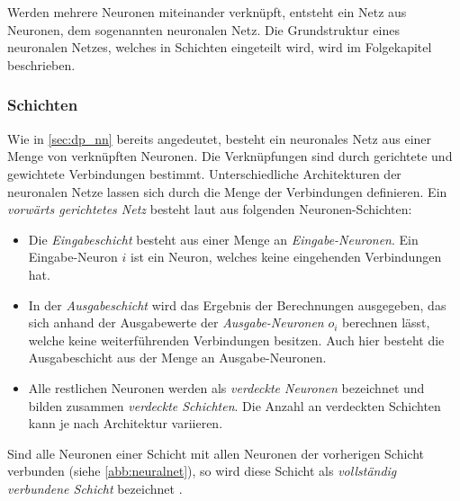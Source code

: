 \documentclass[12pt,a4paper,bibliography=totocnumbered,listof=totocnumbered]{article}
\begin{document}
\\\\Werden mehrere Neuronen miteinander verknüpft, entsteht ein Netz aus Neuronen, dem sogenannten neuronalen Netz. Die Grundstruktur eines neuronalen Netzes, welches in Schichten eingeteilt wird, wird im Folgekapitel beschrieben.

\subsubsection{Schichten}
Wie in \autoref{sec:dp_nn} bereits angedeutet, besteht ein neuronales Netz aus einer Menge von verknüpften Neuronen. Die Verknüpfungen sind durch gerichtete und gewichtete Verbindungen bestimmt. Unterschiedliche Architekturen der neuronalen Netze lassen sich durch die Menge der Verbindungen definieren. Ein \emph{vorwärts gerichtetes Netz} besteht laut \citep[S. 196 f.]{UweLammel.2020} aus folgenden Neuronen-Schichten:
\begin{itemize}
\item Die \emph{Eingabeschicht} besteht aus einer Menge an \emph{Eingabe-Neuronen}. Ein Eingabe-Neuron $i$ ist ein Neuron, welches keine eingehenden Verbindungen hat.
\item In der \emph{Ausgabeschicht} wird das Ergebnis der Berechnungen ausgegeben, das sich anhand der Ausgabewerte der \emph{Ausgabe-Neuronen} $o_i$ berechnen lässt, welche keine weiterführenden Verbindungen besitzen. Auch hier besteht die Ausgabeschicht aus der Menge an Ausgabe-Neuronen.
\item Alle restlichen Neuronen werden als \emph{verdeckte Neuronen} bezeichnet und bilden zusammen \emph{verdeckte Schichten}. Die Anzahl an verdeckten Schichten kann je nach Architektur variieren. 
\end{itemize}
Sind alle Neuronen einer Schicht mit allen Neuronen der vorherigen Schicht verbunden (siehe \autoref{abb:neuralnet}), so wird diese Schicht als \emph{vollständig verbundene Schicht} bezeichnet \citep[S. 122]{Krohn.2020}.  
\end{document}

